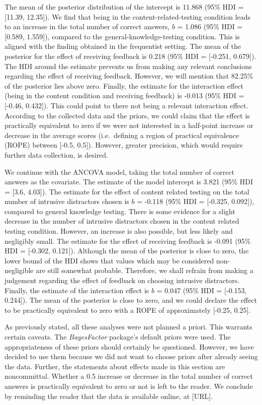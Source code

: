 \documentclass[11pt,]{article}
\begin{document}
The mean of the posterior distribution of the intercept is 11.868 (95\%
HDI = {[}11.39, 12.35{]}). We find that being in the
content-related-testing condition leads to an increase in the total
number of correct answers, \(b\) = 1.086 (95\% HDI = {[}0.589,
1.559{]}), compared to the general-knowledge-testing condition. This is
aligned with the finding obtained in the frequentist setting. The mean
of the posterior for the effect of receiving feedback is 0.218 (95\% HDI
= {[}-0.251, 0.679{]}). The HDI around the estimate prevents us from
making any relevant conclusions regarding the effect of receiving
feedback. However, we will mention that 82.25\% of the posterior lies
above zero. Finally, the estimate for the interaction effect (being in
the content condition and receiving feedback) is -0.013 (95\% HDI =
{[}-0.46, 0.432{]}). This could point to there not being a relevant
interaction effect. According to the collected data and the priors, we
could claim that the effect is practically equivalent to zero if we were
not interested in a half-point increase or decrease in the average
scores (i.e.~defining a region of practical equivalence (ROPE) between
{[}-0.5, 0.5{]}). However, greater precision, which would require
further data collection, is desired.

We continue with the ANCOVA model, taking the total number of correct
answers as the covariate. The estimate of the model intercept is 3.821
(95\% HDI = {[}3.6, 4.03{]}). The estimate for the effect of content
related testing on the total number of intrusive distractors chosen is
\(b\) = -0.118 (95\% HDI = {[}-0.325, 0.092{]}), compared to general
knowledge testing. There is some evidence for a slight decrease in the
number of intrusive distractors chosen in the content related testing
condition. However, an increase is also possible, but less likely and
negligibly small. The estimate for the effect of receiving feedback is
-0.091 (95\% HDI = {[}-0.302, 0.121{]}). Although the mean of the
posterior is close to zero, the lower bound of the HDI shows that values
which may be considered non-negligible are still somewhat probable.
Therefore, we shall refrain from making a judgement regarding the effect
of feedback on choosing intrusive distractors. Finally, the estimate of
the interaction effect is \(b\) = 0.047 (95\% HDI = {[}-0.153,
0.244{]}). The mean of the posterior is close to zero, and we could
declare the effect to be practically equivalent to zero with a ROPE of
approximately {[}-0.25, 0.25{]}.

As previously stated, all these analyses were not planned a priori. This
warrants certain caveats. The \textit{BayesFactor} package's default
priors were used. The appropriateness of these priors should certainly
be questioned. However, we have decided to use them because we did not
want to choose priors after already seeing the data. Further, the
statements about effects made in this section are noncommittal. Whether
a 0.5 increase or decrease in the total number of correct answers is
practically equivalent to zero or not is left to the reader. We conclude
by reminding the reader that the data is available online, at {[}URL{]}.
\end{document}
